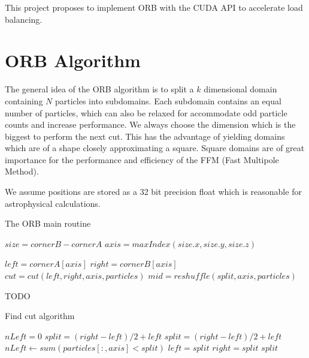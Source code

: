 \documentclass[]{article}
\begin{document}
This project proposes to implement ORB with the CUDA API to accelerate load balancing.

\section{ORB Algorithm}
The general idea of the ORB algorithm is to split a $k$ dimensional domain containing $N$ particles into subdomains. Each subdomain contains an equal number of particles, which can also be relaxed for accommodate odd particle counts and increase performance. We always choose the dimension which is the biggest to perform the next cut. This has the advantage of yielding domains which are of a shape closely approximating a square. Square domains are of great importance for the performance and efficiency of the FFM (Fast Multipole Method).

We assume positions are stored as a 32 bit precision float which is reasonable for astrophysical calculations. 
\begin{algorithm}[H]
	\caption{The ORB main routine}\label{euclid}
	\begin{algorithmic}[1]
		\State $size = cornerB - cornerA$
		\State $axis = maxIndex(size.x, size.y, size.z)$ 
		
		\State $left = cornerA[axis]$
		\State $right = cornerB[axis]$
		\newline
		\State $cut = cut(left, right, axis, particles)$
		\State $mid = reshuffle(split, axis, particles)$
		\newline
		
		TODO
		\State {}
		\EndProcedure
	\end{algorithmic}
\end{algorithm}

\begin{algorithm}[H]
	\caption{Find cut algorithm}\label{euclid}
	\begin{algorithmic}[1]
		\State $nLeft = 0$
		\State $split = (right - left) / 2 + left $ 
		\State $split = (right - left) / 2 + left $
		\State $nLeft\gets sum(particles[:,axis] < split)$
		\State $left = split$
		\Else 
		\State $right = split$
		\EndIf
		\EndWhile\label{euclidendwhile}
		\State \Return $split$
		\EndProcedure
	\end{algorithmic}
\end{algorithm}
\end{document}
